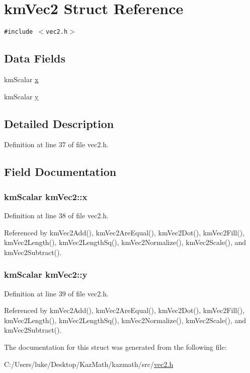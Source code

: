 \hypertarget{structkm_vec2}{
\section{kmVec2 Struct Reference}
\label{structkm_vec2}
}
{\tt \#include $<$vec2.h$>$}

\subsection*{Data Fields}
\begin{CompactItemize}
\item 
kmScalar \hyperlink{structkm_vec2_8f17399ac844ce3b973d09d28e78429a}{x}
\item 
kmScalar \hyperlink{structkm_vec2_21eee8f77413b24dd6a8a19314d61fed}{y}
\end{CompactItemize}


\subsection{Detailed Description}


Definition at line 37 of file vec2.h.

\subsection{Field Documentation}
\hypertarget{structkm_vec2_8f17399ac844ce3b973d09d28e78429a}{
\subsubsection[{x}]{\setlength{\rightskip}{0pt plus 5cm}kmScalar {\bf kmVec2::x}}}
\label{structkm_vec2_8f17399ac844ce3b973d09d28e78429a}




Definition at line 38 of file vec2.h.

Referenced by kmVec2Add(), kmVec2AreEqual(), kmVec2Dot(), kmVec2Fill(), kmVec2Length(), kmVec2LengthSq(), kmVec2Normalize(), kmVec2Scale(), and kmVec2Subtract().\hypertarget{structkm_vec2_21eee8f77413b24dd6a8a19314d61fed}{
\subsubsection[{y}]{\setlength{\rightskip}{0pt plus 5cm}kmScalar {\bf kmVec2::y}}}
\label{structkm_vec2_21eee8f77413b24dd6a8a19314d61fed}




Definition at line 39 of file vec2.h.

Referenced by kmVec2Add(), kmVec2AreEqual(), kmVec2Dot(), kmVec2Fill(), kmVec2Length(), kmVec2LengthSq(), kmVec2Normalize(), kmVec2Scale(), and kmVec2Subtract().

The documentation for this struct was generated from the following file:\begin{CompactItemize}
\item 
C:/Users/luke/Desktop/KazMath/kazmath/src/\hyperlink{vec2_8h}{vec2.h}\end{CompactItemize}
